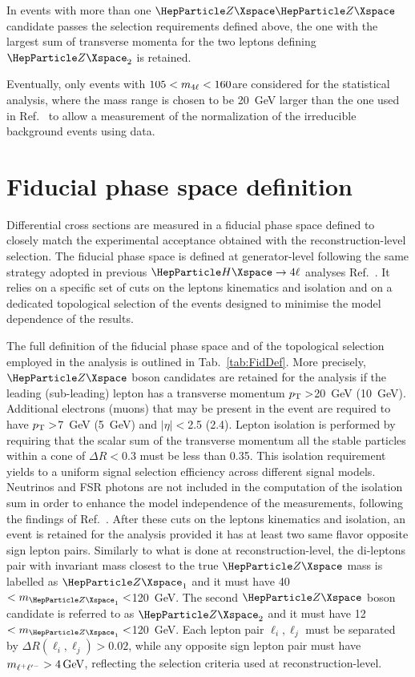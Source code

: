 In events with more than one $\PZ\PZ$ candidate passes the selection requirements defined above, the one with the largest sum of transverse momenta for the two leptons defining $\PZ_2$ is retained.

Eventually, only events with $105<m_{4\ell}<160$\GeV are considered for the statistical analysis, where the mass range is chosen to be 20~GeV larger than the one used in Ref.~\cite{CMSHIG19001} to allow a measurement of the normalization of the irreducible background events using data. 

\section{Fiducial phase space definition}
\label{sec:fiducialvolume}
Differential cross sections are  measured in a fiducial phase space defined to closely match the experimental acceptance obtained with the reconstruction-level selection. 
The fiducial phase space is defined at generator-level following the same strategy adopted in previous $\PH\rightarrow4\ell$ analyses Ref.~\cite{CMSH4l2016,CMSHIG19001}. It relies on a specific set of cuts on the leptons kinematics and isolation and on a dedicated topological selection of the events designed to minimise the model dependence of the results.

The full definition of the fiducial phase space and of the topological selection employed in the analysis is outlined in Tab.~\ref{tab:FidDef}. More precisely, $\PZ$ boson candidates are retained for the analysis if the leading (sub-leading)
lepton has a transverse momentum $p_{\mathrm{T}}>$20~GeV (10~GeV). Additional electrons (muons) that may be present in the event are required to have  $p_{\mathrm{T}}>$7~GeV (5~GeV) and $\mid\eta\mid<$2.5 (2.4). Lepton isolation is performed by requiring that the scalar sum of the transverse momentum all the stable particles within a cone of $\Delta R<0.3$ must be less than 0.35.
This isolation requirement yields to a uniform signal selection efficiency across different signal models. 
Neutrinos and FSR photons are not included in the computation of the isolation sum in order to enhance the model independence of the measurements, following the findings of Ref.~\cite{Khachatryan:2015yvw}.
After these cuts on the leptons kinematics and isolation, an event is retained for the analysis provided it has at least two same flavor opposite sign lepton pairs.
Similarly to what is done at reconstruction-level, the di-leptons pair with invariant mass closest to the true $\PZ$ mass is labelled as $\PZ_{1}$ and it must have 40$<m_{\PZ_{1}}<$120~GeV.
The second $\PZ$ boson candidate is referred to as $\PZ_{2}$ and it must have 12$<m_{\PZ_{1}}<$120~GeV.
Each lepton pair $\ell_i, \ell_j$ must be separated by $\Delta R(\ell_i, \ell_j) > 0.02$, while any opposite sign lepton pair must have  $m_{\ell^{+}\ell'^{-}} > 4\,\text{Ge\hspace{-.08em}V}$, reflecting the selection criteria used at reconstruction-level.

